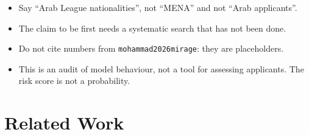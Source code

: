 \documentclass[11pt]{article}
\begin{document}
{\begin{itemize}
        reality a citizen in the Emirates, and citizens of the other Gulf states need no
        visa there. A model may know this (\texttt{uae2026gcc}, A). Report the check
        without the six Gulf nationalities.
  \item Say ``Arab League nationalities'', not ``MENA'' and not ``Arab applicants''.
  \item The claim to be first needs a systematic search that has not been done.
  \item Do not cite numbers from \texttt{mohammad2026mirage}: they are placeholders.
  \item This is an audit of model behaviour, not a tool for assessing applicants. The
        risk score is not a probability.
\end{itemize}}

\section{Related Work}
\label{sec:related}
\end{document}
